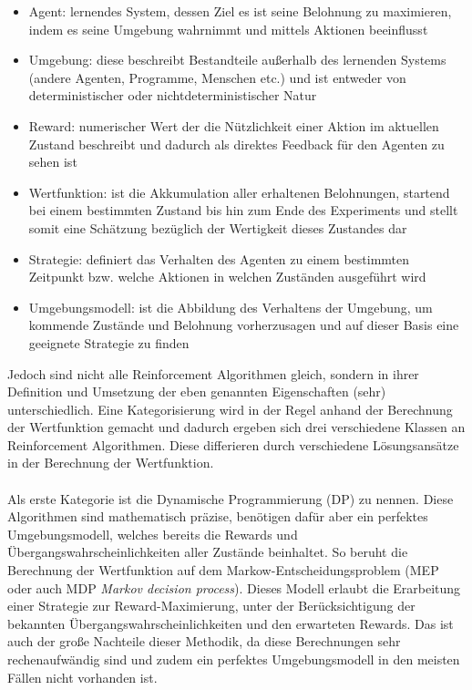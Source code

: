 \begin{itemize}
    \item Agent: lernendes System, dessen Ziel es ist seine Belohnung zu maximieren, indem es seine Umgebung wahrnimmt und mittels Aktionen beeinflusst
    \item Umgebung: diese beschreibt Bestandteile außerhalb des lernenden Systems (andere Agenten, Programme, Menschen etc.) und ist entweder von deterministischer oder nichtdeterministischer Natur
    \item Reward: numerischer Wert der die Nützlichkeit einer Aktion im aktuellen Zustand beschreibt und dadurch als direktes Feedback für den Agenten zu sehen ist
    \item Wertfunktion: ist die Akkumulation aller erhaltenen Belohnungen, startend bei einem bestimmten Zustand bis hin zum Ende des Experiments und stellt somit eine Schätzung bezüglich der Wertigkeit dieses Zustandes dar
    \item Strategie: definiert das Verhalten des Agenten zu einem bestimmten Zeitpunkt bzw. welche Aktionen in welchen Zuständen ausgeführt wird
    \item Umgebungsmodell: ist die Abbildung des Verhaltens der Umgebung, um kommende Zustände und Belohnung vorherzusagen und auf dieser Basis eine geeignete Strategie zu finden
\end{itemize}
Jedoch sind nicht alle Reinforcement Algorithmen gleich, sondern in ihrer Definition und Umsetzung der eben genannten Eigenschaften (sehr) unterschiedlich. Eine Kategorisierung wird in der Regel anhand der Berechnung der Wertfunktion gemacht und dadurch ergeben sich drei verschiedene Klassen an Reinforcement Algorithmen. Diese differieren durch verschiedene Lösungsansätze in der Berechnung der Wertfunktion. \\\\
Als erste Kategorie ist die Dynamische Programmierung (DP) zu nennen.
Diese Algorithmen sind mathematisch präzise, benötigen dafür aber ein perfektes Umgebungsmodell, welches bereits die Rewards und Übergangswahrscheinlichkeiten aller Zustände beinhaltet. So beruht die Berechnung der Wertfunktion auf dem Markow-Entscheidungsproblem (MEP oder auch MDP \textit{Markov decision process}). Dieses Modell erlaubt die Erarbeitung einer Strategie zur Reward-Maximierung, unter der Berücksichtigung der bekannten Übergangswahrscheinlichkeiten und den erwarteten Rewards. 
Das ist auch der große Nachteile dieser Methodik, da diese Berechnungen sehr rechenaufwändig sind und zudem ein perfektes Umgebungsmodell in den meisten Fällen nicht vorhanden ist.\\\\
